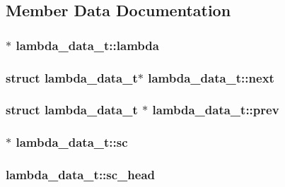 \subsection{\-Member \-Data \-Documentation}
\hypertarget{structlambda__data__t_a8c3a264e5f68a88a8112966a1b95e070}{
\subsubsection[{lambda}]{$\ast$ {\bf lambda\-\_\-data\-\_\-t\-::lambda}}}\label{structlambda__data__t_a8c3a264e5f68a88a8112966a1b95e070}
\hypertarget{structlambda__data__t_a911037b4758b690460043d4db0f25556}{
\subsubsection[{next}]{\setlength{\rightskip}{0pt plus 5cm}struct {\bf lambda\-\_\-data\-\_\-t}$\ast$ {\bf lambda\-\_\-data\-\_\-t\-::next}}}\label{structlambda__data__t_a911037b4758b690460043d4db0f25556}
\hypertarget{structlambda__data__t_ad0163124af1988e1d26bf089fe78a772}{
\subsubsection[{prev}]{\setlength{\rightskip}{0pt plus 5cm}struct {\bf lambda\-\_\-data\-\_\-t} $\ast$ {\bf lambda\-\_\-data\-\_\-t\-::prev}}}\label{structlambda__data__t_ad0163124af1988e1d26bf089fe78a772}
\hypertarget{structlambda__data__t_a7fd958960cc0b9391c0f8982f2c5f108}{
\subsubsection[{sc}]{$\ast$ {\bf lambda\-\_\-data\-\_\-t\-::sc}}}\label{structlambda__data__t_a7fd958960cc0b9391c0f8982f2c5f108}
\hypertarget{structlambda__data__t_a454872233ee65fd4a1afb865e390464c}{
\subsubsection[{sc\-\_\-head}]{ {\bf lambda\-\_\-data\-\_\-t\-::sc\-\_\-head}}}\label{structlambda__data__t_a454872233ee65fd4a1afb865e390464c}
